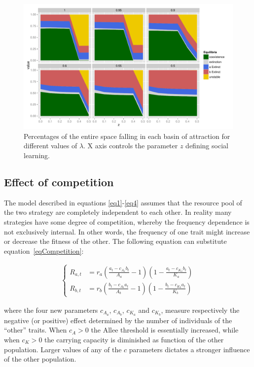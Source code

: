 \documentclass[3p,authoryear,twocolumn]{elsarticle} %
\begin{document}
\begin{figure}[h!]
  \centering
      \includegraphics[width=\textwidth]{./figures/figure6}
  \caption{Percentages of the entire space falling in each basin of attraction for different values of $\lambda$. X axis controls the parameter $z$ defining social learning.}
    \label{fig:percentages}
\end{figure}


\subsection{Effect of competition}

The model described in equations \ref{eq1}-\ref{eq4} assumes that the resource pool of the two strategy are completely independent to each other. In reality many strategies have some degree of competition, whereby the frequency dependence is not exclusively internal. In other words, the frequency of one trait might increase or decrease the fitness of the other. The following equation can substitute equation~\eqref{eqCompetition}: 

\begin{align}
\begin{cases}
R_{a,t}& = r_a (\frac{a_t-c_{A_a}b_t}{A_a}-1)(1-\frac{a_t-c_{K_a}b_t}{K_a})\\
R_{b,t}& = r_b (\frac{b_t-c_{A_b}a_t}{A_b}-1)(1-\frac{b_t-c_{K_b}a_t}{K_b}) 
\end{cases}
\label{eqCompetition}
\end{align}

where the four new parameters $c_{A_a}$, $c_{A_b}$, $c_{K_a}$ and $c_{K_b}$, measure respectively the negative (or positive) effect determined by the number of individuals of the “other” traits. When $c_{A}>0$ the Allee threshold is essentially increased, while when $c_{K}>0$ the carrying capacity is diminished as function of the other population. Larger values of any of the $c$ parameters dictates a stronger influence of the other population. 
\end{document}
